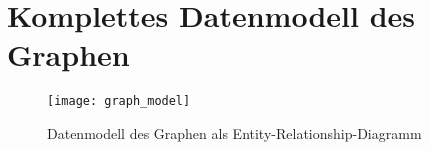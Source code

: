 \chapter{Komplettes Datenmodell des Graphen}
\label{complete_data_model}

\begin{figure}[h]
\label{fig:graph_model}
\begin{center}
    \texttt{[image: graph\_model]}
\end{center}
\caption{Datenmodell des Graphen als Entity-Relationship-Diagramm}
\end{figure}